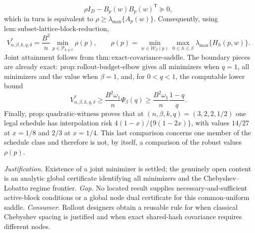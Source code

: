 \documentclass{article}
\begin{document}
\[
 \rho I_D-B_p(w)B_p(w)^{\mathsf T}\succeq0,
\]
which in turn is equivalent to \(\rho\ge\lambda_{\max}\{A_p(w)\}\).  Consequently, using \(\mathrm{lem{:}subset\text{-}lattice\text{-}block\text{-}reduction}\),
\[
 V^*_{n,\beta,k,q,\delta}
 =\frac{B^2}{n}\min_{p\in\mathcal P_{k,q,\delta}}\rho(p),
 \qquad
 \rho(p)=\min_{w\in\mathcal W_\beta(p)}
 \max_{0\le h\le\beta}\lambda_{\max}\{H_h(p,w)\}.
\]
Joint attainment follows from \(\mathrm{thm{:}exact\text{-}covariance\text{-}saddle}\).  The boundary pieces are already exact: \(\mathrm{prop{:}rollout\text{-}budget\text{-}elbow}\) gives all minimizers when \(q=1\), all minimizers and the value when \(\beta=1\), and, for \(0<q<1\), the computable lower bound
\[
 V^*_{n,\beta,k,q,\delta}
 \ge \frac{B^2\omega_1}{n}\Psi_\beta(q)
 \ge \frac{B^2\omega_1}{n}\frac{1-q}{q}.
\]
Finally, \(\mathrm{prop{:}quadratic\text{-}witness}\) proves that at \((n,\beta,k,q)=(3,2,2,1/2)\) one legal schedule has interpolation risk \(4(1-x)/\{9(1-2x)\}\), with values \(14/27\) at \(x=1/8\) and \(2/3\) at \(x=1/4\).  This last comparison concerns one member of the schedule class and therefore is not, by itself, a comparison of the robust values \(\rho(p)\).
\par\smallskip\noindent \textit{Justification.} Existence of a joint minimizer is settled; the genuinely open content is an analytic global certificate identifying all minimizers and the Chebyshev--Lobatto regime frontier. \textit{Gap.} No located result supplies necessary-and-sufficient active-block conditions or a global node dual certificate for this common-uniform saddle. \textit{Consumer.} Rollout designers obtain a reusable rule for when classical Chebyshev spacing is justified and when exact shared-hash covariance requires different nodes.
\end{document}
